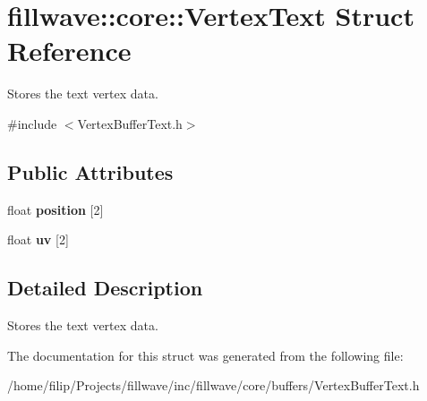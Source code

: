 \hypertarget{structfillwave_1_1core_1_1VertexText}{}\section{fillwave\+:\+:core\+:\+:Vertex\+Text Struct Reference}
\label{structfillwave_1_1core_1_1VertexText}


Stores the text vertex data.  




{\ttfamily \#include $<$Vertex\+Buffer\+Text.\+h$>$}

\subsection*{Public Attributes}
\begin{DoxyCompactItemize}
\item 
\hypertarget{structfillwave_1_1core_1_1VertexText_ab44233a1252c794d3c1958b8ec27dc36}{}float {\bfseries position} \mbox{[}2\mbox{]}\label{structfillwave_1_1core_1_1VertexText_ab44233a1252c794d3c1958b8ec27dc36}

\item 
\hypertarget{structfillwave_1_1core_1_1VertexText_acbe1ed0755ed93da67c17dfed828ea85}{}float {\bfseries uv} \mbox{[}2\mbox{]}\label{structfillwave_1_1core_1_1VertexText_acbe1ed0755ed93da67c17dfed828ea85}

\end{DoxyCompactItemize}


\subsection{Detailed Description}
Stores the text vertex data. 

The documentation for this struct was generated from the following file\+:\begin{DoxyCompactItemize}
\item 
/home/filip/\+Projects/fillwave/inc/fillwave/core/buffers/Vertex\+Buffer\+Text.\+h\end{DoxyCompactItemize}
